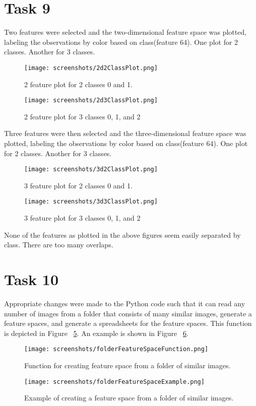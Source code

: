 \documentclass[sigconf]{acmart}
\begin{document}
\section{Task 9}
Two features were selected and the two-dimensional feature space was plotted, labeling the observations by color based on class(feature 64).
One plot for 2 classes. Another for 3 classes.
\begin{figure}[h]
 \centering
    \texttt{[image: screenshots/2d2ClassPlot.png]}
    \caption{2 feature plot for 2 classes 0 and 1.}
    \label{fig:2feature2class}
\end{figure}
\begin{figure}[h]
 \centering
    \texttt{[image: screenshots/2d3ClassPlot.png]}
    \caption{2 feature plot for 3 classes 0, 1, and 2}
    \label{fig:2feature3class}
\end{figure}
Three features were then selected and the three-dimensional feature space was plotted, labeling the observations by color based on class(feature 64).
One plot for 2 classes. Another for 3 classes.
\begin{figure}[h]
 \centering
    \texttt{[image: screenshots/3d2ClassPlot.png]}
    \caption{3 feature plot for 2 classes 0 and 1.}
    \label{fig:3feature2class}
\end{figure}
\begin{figure}[h]
 \centering
    \texttt{[image: screenshots/3d3ClassPlot.png]}
    \caption{3 feature plot for 3 classes 0, 1, and 2}
    \label{fig:3feature3class}
\end{figure}
None of the features as plotted in the above figures seem easily separated by class. There are too many overlaps.

\section{Task 10}
Appropriate changes were made to the Python code such that it can read any number of images from a folder that consists of many similar images, generate a feature spaces, and generate a spreadsheets for the feature spaces. This function is depicted in Figure ~\ref{fig:folderFeatureSpaceFunction}.
An example is shown in Figure ~\ref{fig:folderFeatureSpaceExample}.
\begin{figure}[h]
 \centering
    \texttt{[image: screenshots/folderFeatureSpaceFunction.png]}
    \caption{Function for creating feature space from a folder of similar images.}
    \label{fig:folderFeatureSpaceFunction}
\end{figure}
\begin{figure}[h]
 \centering
    \texttt{[image: screenshots/folderFeatureSpaceExample.png]}
    \caption{Example of creating a feature space from a folder of similar images.}
    \label{fig:folderFeatureSpaceExample}
\end{figure}
\end{document}
